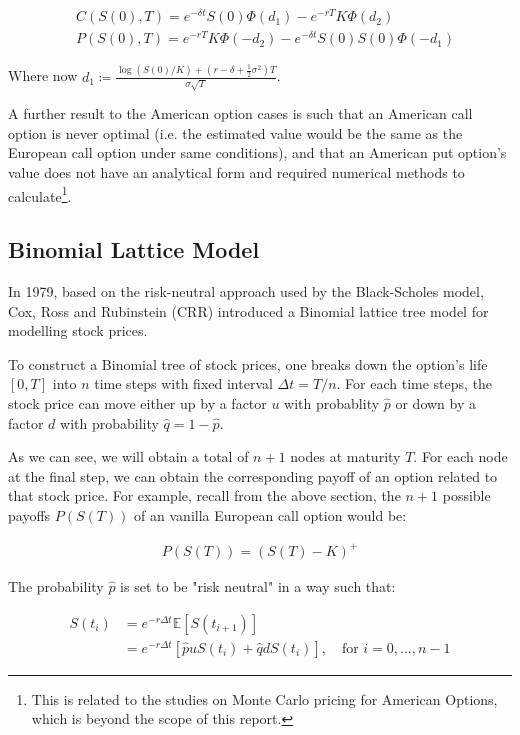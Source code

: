 \begin{align}
	&C(S(0), T) = e^{-\delta t}S(0)\Phi(d_1) - e^{-rT}K\Phi(d_2) \\
	&P(S(0), T) = e^{-rT}K\Phi(-d_2) - e^{-\delta t}S(0)S(0)\Phi(-d_1)
\end{align}

Where now $d_1 \coloneqq \frac{\log(S(0)/K)+(r-\delta+\frac{1}{2}\sigma^2)T}{\sigma\sqrt{T}}$.

A further result to the American option cases is such that an American call option is never optimal (i.e. the estimated value would be the same as the European call option under same conditions), and that an American put option's value does not have an analytical form and required numerical methods to calculate\footnote{This is related to the studies on Monte Carlo pricing for American Options, which is beyond the scope of this report.}.

\subsection{Binomial Lattice Model}

In 1979, based on the risk-neutral approach used by the Black-Scholes model, Cox, Ross and Rubinstein (CRR) \cite{CRR1979} introduced a Binomial lattice tree model for modelling stock prices.

To construct a Binomial tree of stock prices, one breaks down the option's life $[0,T]$ into $n$ time steps with fixed interval $\Delta t=T/n$. For each time steps, the stock price can move either up by a factor $u$ with probablity $\hat{p}$ or down by a factor $d$ with probability $\hat{q}=1-\hat{p}$.


As we can see, we will obtain a total of $n+1$ nodes at maturity $T$. For each node at the final step, we can obtain the corresponding payoff of an option related to that stock price. For example, recall from the above section, the $n+1$ possible payoffs $P(S(T))$ of an vanilla European call option would be:

\begin{align}
P(S(T))=(S(T)-K)^+
\end{align}

The probability $\hat{p}$ is set to be "risk neutral" in a way such that:

\begin{align}
S(t_{i}) &= e^{-r\Delta t}\mathbb{E}[S(t_{i+1})] \\
		 &= e^{-r\Delta t}[\hat{p}uS(t_i)+\hat{q}dS(t_i)],\quad\text{for }i=0,...,n-1
\end{align}

